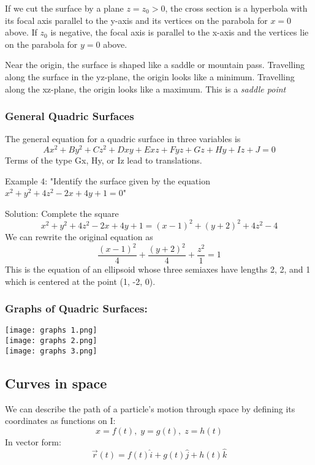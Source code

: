 \documentclass[12pt]{article}
\begin{document}
If we cut the surface by a plane $z = z_0 > 0$, the cross section is a hyperbola with its focal axis parallel to the y-axis and its vertices on the parabola for $x=0$ above. If $z_0$ is negative, the focal axis is parallel to the x-axis and the vertices lie on the parabola for $y = 0$ above. 

Near the origin, the surface is shaped like a saddle or mountain pass. Travelling along the surface in the yz-plane, the origin looks like a minimum. Travelling along the xz-plane, the origin looks like a maximum. This is a \emph{saddle point}

\subsubsection{General Quadric Surfaces}
The general equation for a quadric surface in three variables is 
$$Ax^2 + By^2 + Cz^2 + Dxy + Exz + Fyz + Gz + Hy + Iz + J = 0$$
Terms of the type Gx, Hy, or Iz lead to translations.

Example 4:
"Identify the surface given by the equation $x^2 + y^2 + 4z^2 - 2x + 4y + 1 = 0$"

Solution:
Complete the square
$$x^2 + y^2 + 4z^2 - 2x + 4y + 1 = (x -1)^2 + (y+2)^2 + 4z^2 - 4$$
We can rewrite the original equation as 
$$\frac{(x-1)^2}{4} + \frac{(y+2)^2}{4} + \frac{z^2}{1} =1$$
This is the equation of an ellipsoid whose three semiaxes have lengths 2, 2, and 1 which is centered at the point (1, -2, 0). 

\subsubsection{Graphs of Quadric Surfaces:}
\begin{center}
    \texttt{[image: graphs 1.png]}\\
    \texttt{[image: graphs 2.png]}\\\texttt{[image: graphs 3.png]}\\
\end{center}

\subsection{Curves in space}
We can describe the path of a particle's motion through space by defining its coordinates as functions on I:
$$x=f(t), \; y=g(t),\; z=h(t)$$
In vector form:
$$\vec{r}(t) = f(t) \hat{i} + g(t)\hat{j} + h(t) \hat{k}$$
\end{document}
